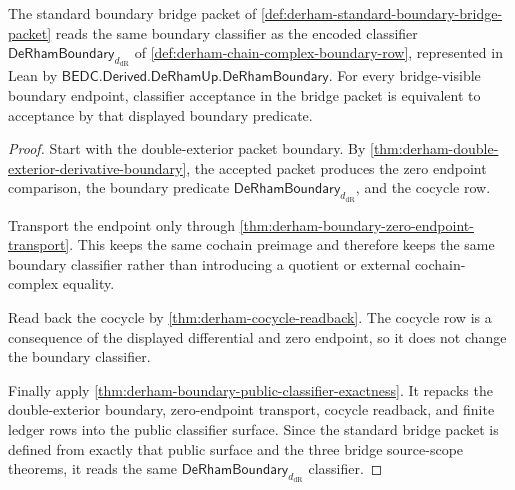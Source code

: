 \begin{theorem}
\label{thm:derham-standard-boundary-classifier-compatibility}
The standard boundary bridge packet of
\autoref{def:derham-standard-boundary-bridge-packet} reads the same boundary
classifier as the encoded classifier
$\mathsf{DeRhamBoundary}_{d_{\mathrm{dR}}}$ of
\autoref{def:derham-chain-complex-boundary-row}, represented in Lean by
$\mathsf{BEDC.Derived.DeRhamUp.DeRhamBoundary}$.
For every bridge-visible boundary endpoint, classifier acceptance in the bridge
packet is equivalent to acceptance by that displayed boundary predicate.
\end{theorem}
\begin{proof}
Start with the double-exterior packet boundary. By
\autoref{thm:derham-double-exterior-derivative-boundary}, the accepted packet
produces the zero endpoint comparison, the boundary predicate
$\mathsf{DeRhamBoundary}_{d_{\mathrm{dR}}}$, and the cocycle row.

Transport the endpoint only through
\autoref{thm:derham-boundary-zero-endpoint-transport}. This keeps the same
cochain preimage and therefore keeps the same boundary classifier rather than
introducing a quotient or external cochain-complex equality.

Read back the cocycle by \autoref{thm:derham-cocycle-readback}. The cocycle
row is a consequence of the displayed differential and zero endpoint, so it
does not change the boundary classifier.

Finally apply
\autoref{thm:derham-boundary-public-classifier-exactness}. It repacks the
double-exterior boundary, zero-endpoint transport, cocycle readback, and
finite ledger rows into the public classifier surface. Since the standard
bridge packet is defined from exactly that public surface and the three
bridge source-scope theorems, it reads the same
$\mathsf{DeRhamBoundary}_{d_{\mathrm{dR}}}$ classifier.
\end{proof}

